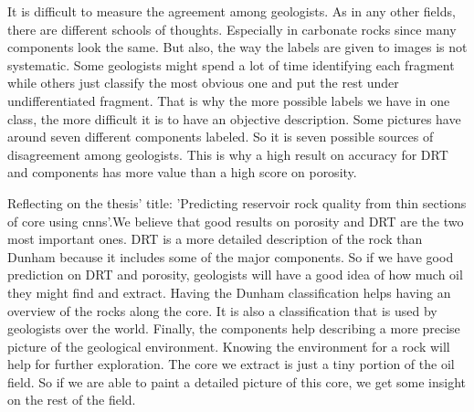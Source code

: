 It is difficult to measure the agreement among geologists. As in any other fields, there are different schools of thoughts. Especially in carbonate rocks since many components look the same. But also, the way the labels are given to images is not systematic. Some geologists might spend a lot of time identifying each fragment while others just classify the most obvious one and put the rest under undifferentiated fragment. That is why the more possible labels we have in one class, the more difficult it is to have an objective description. Some pictures have around seven different components labeled. So it is seven possible sources of disagreement among geologists. This is why a high result on accuracy for DRT and components has more value than a high score on porosity. 


Reflecting on the thesis' title: 'Predicting reservoir rock quality from thin sections of core using \gls{cnn}s'.We believe that good results on porosity and DRT are the two most important ones. DRT is a more detailed description of the rock than Dunham because it includes some of the major components. So if we have good prediction on DRT and porosity, geologists will have a good idea of how much oil they might find and extract. Having the Dunham classification helps having an overview of the rocks along the core. It is also a classification that is used by geologists over the world. Finally, the components help describing a more precise picture of the geological environment. Knowing the environment for a rock will help for further exploration. The core we extract is just a tiny portion of the oil field. So if we are able to paint a detailed picture of this core, we get some insight on the rest of the field. 